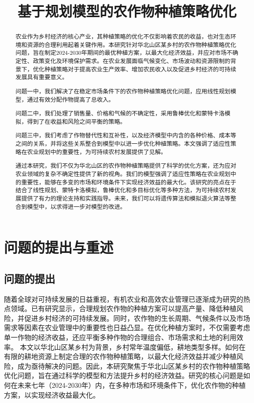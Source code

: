 \documentclass[withoutpreface]{cumcmthesis}
\title{基于规划模型的农作物种植策略优化}
\begin{document}
\maketitle

\begin{abstract}
农业作为乡村经济的核心产业，其种植策略的优化不仅影响着农民的收益，也对生态环境和资源的合理利用起着关键作用。本研究针对华北山区某乡村的农作物种植策略优化问题，旨在制定2024-2030年期间的最优种植方案，以最大化经济效益，并应对市场不确定性、政策变化及环境保护需求。在农业发展面临气候变化、市场波动和资源限制的背景下，优化种植策略对于提高农业生产效率、增加农民收入以及促进乡村经济的可持续发展具有重要意义。

问题一中，我们解决了在稳定市场条件下的农作物种植策略优化问题，应用线性规划模型，通过有效分配作物提高了总收入。

问题二中，我们处理了销售量、价格和气候的不确定性，采用鲁棒优化和蒙特卡洛模拟，得到了在收益和风险之间平衡的策略。

问题三中，我们考虑了作物替代性和互补性，以及经济模型中内含的各种价格、成本等之间的关系，并将这些关系整合到模型中以进一步优化种植策略。本文强调了适应性策略在农业规划中的重要性，为可持续农村发展提供了见解。

通过本研究，我们不仅为华北山区的农作物种植策略提供了科学的优化方案，还为应对农业领域的复杂不确定性提供了新的视角。我们的模型强调了适应性策略在农业规划中的重要性，能够在多变的市场和环境条件下实现经济效益的最大化。该研究的亮点在于结合了线性规划、蒙特卡洛模拟，鲁棒优化和多目标优化等多种方法，为可持续农村发展提供了有力的理论支持和实践指导。未来，我们可以将遗传算法和模拟退火算法等整合到模型中，以求得进一步对模型的改进。


\end{abstract}

\section{问题的提出与重述}
\subsection{问题的提出}
随着全球对可持续发展的日益重视，有机农业和高效农业管理已逐渐成为研究的热点领域。已有研究显示，合理规划农作物的种植方案可以提高产量、降低种植风险，并促进乡村经济的可持续发展\cite{ref1}。同时，农作物的生长周期、气候条件以及市场需求等因素在农业管理中的重要性也日益凸显。在优化种植方案时，不仅需要考虑单一作物的经济收益，还应平衡多种作物的合理组合、市场需求和土地的利用效率。
本文以华北山区某乡村为背景，乡村常年温度偏低，耕地类型多样。如何在有限的耕地资源上制定合理的农作物种植策略，以最大化经济效益并减少种植风险，成为亟待解决的问题。因此，本研究聚焦于华北山区某乡村的农作物种植策略优化问题，旨在通过科学的模型和方法提升乡村的经济效益。研究的核心问题是如何在未来七年（2024-2030年）内，在多种市场和环境条件下，优化农作物的种植方案，以实现经济收益最大化。
\end{document}

